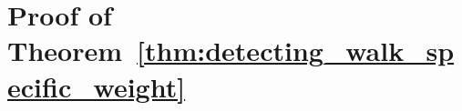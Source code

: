 \section{Proof of Theorem~\ref{thm:detecting_walk_specific_weight}}
\label{regexp:sec:paths-in-graph}


\BiblatexSplitbibDefernumbersWarningOff

\backmatter
{}
\printbibliography[segment=\therefsegment,heading=subbibintoc]